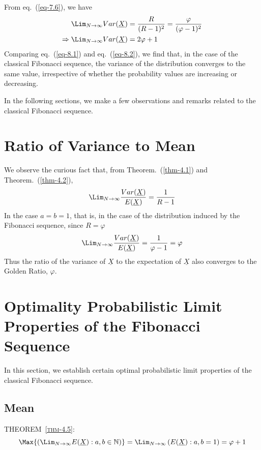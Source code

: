 \begin{multicols}{2}
From eq.~(\ref{eq-7.6}), we have
\begin{align}
\displaystyle{\Lim_{N \rightarrow \infty}}Var(\underline{X}) &= \frac{R}{(R-1)^2} =\frac{\varphi}{(\varphi-1)^2} \nonumber \\
\Rightarrow \displaystyle{\Lim_{N \rightarrow \infty}}Var(\underline{X}) &= 2\varphi + 1\label{eq-8.2}
\end{align}
Comparing eq.~(\ref{eq-8.1}) and eq.~(\ref{eq-8.2}), we find that, in the case of the classical Fibonacci sequence, the variance of the distribution converges to the same value, irrespective of whether the probability values are increasing or decreasing.

In the following sections, we make a few observations and remarks related to the classical Fibonacci sequence.

\vspace{-.3cm}

\section{Ratio of Variance to Mean}\label{section-9}
We observe the curious fact that, from Theorem.~(\ref{thm-4.1}) and Theorem.~(\ref{thm-4.2}),
\begin{equation}
\Lim_{N\rightarrow \infty} \frac{Var(\underline{X})}{E(\underline{X})} = \frac{1}{R-1}\label{eq-9.1}
\end{equation}
In the case $a = b = 1$, that is, in the case of the distribution induced by the Fibonacci sequence, since $R = \varphi$
\begin{equation}
\Lim_{N\rightarrow \infty} \frac{Var(\underline{X})}{E(\underline{X})} = \frac{1}{\varphi-1} = \varphi\label{eq-9.2}
\end{equation}
Thus the ratio of the variance of $\underline{X}$ to the expectation of $\underline{X}$ also converges to the Golden Ratio, $\varphi$.

\section{Optimality Probabilistic Limit\\ Properties of the Fibonacci\\ Sequence}\label{section-10}
In this section, we establish certain optimal probabilistic limit properties of the classical Fibonacci sequence. 

\subsection{Mean}\label{subsection-10.1}
\textsc{THEOREM~{\ref{thm-4.5}}:}
{\fontsize{8}{9}\selectfont\begin{equation*}
\Max{\left(\Lim_{N\rightarrow \infty} E(\underline{X}): a, b \in \mathbb N\right)} = \Lim_{N \rightarrow \infty}\left(E(\underline{X}) : a,b = 1\right) = \varphi + 1
\end{equation*}}


\end{multicols}
